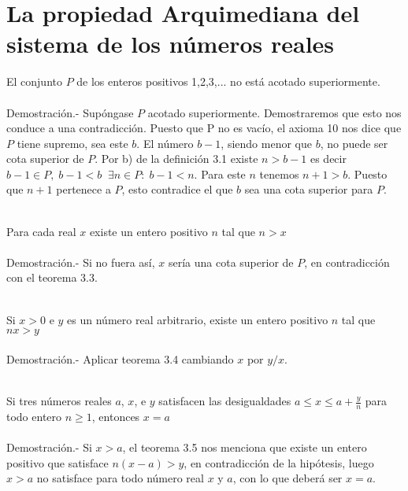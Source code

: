\section{La propiedad Arquimediana del sistema de los números reales}
\begin{teo}
El conjunto $P$ de los enteros positivos 1,2,3,... no está acotado superiormente.\\\\
Demostración.- \; Supóngase $P$ acotado superiormente. Demostraremos que esto nos conduce a una contradicción. Puesto que P no es vacío, el axioma 10 nos dice que $P$ tiene supremo, sea este $b$. El número $b-1$, siendo menor que $b$, no puede ser cota superior de $P$. Por b) de la definición 3.1 existe $n>b-1$ es decir $b-1 \in P, \; b-1<b \; \; \exists n \in P:\; b-1<n$. Para este $n$ tenemos $n+1>b$. Puesto que $n+1$ pertenece a $P$, esto contradice el que $b$ sea una cota superior para $P$. \\\\
\end{teo}

\begin{teo}
Para cada real $x$ existe un entero positivo $n$ tal que $n>x$\\\\
Demostración.- \; Si no fuera así, $x$ sería una cota superior de $P$, en contradicción con el teorema 3.3.\\\\
\end{teo}

\begin{teo}
Si $x>0$ e $y$ es un número real arbitrario, existe un entero positivo $n$ tal que $nx>y$\\\\
Demostración.- \; Aplicar teorema 3.4 cambiando $x$ por $y/x$.\\\\
\end{teo}

\begin{teo}
Si tres números reales $a$, $x$, e $y$ satisfacen las desigualdades $a\leq x \leq a+\displaystyle\frac{y}{n}$ para todo entero $n \geq 1$, entonces $x=a$\\\\
Demostración.- \; Si $x>a$, el teorema 3.5 nos menciona que existe un entero positivo que satisface $n(x-a)>y$, en contradicción de la hipótesis, luego $x>a$ no satisface para todo número real $x$ y $a$, con lo que deberá ser $x=a$.\\\\
\end{teo} 
\setcounter{section}{11}

